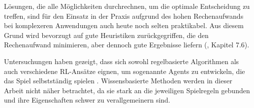 Lösungen, die alle Möglichkeiten durchrechnen, um die optimale Entscheidung zu treffen, sind für den Einsatz in der Praxis aufgrund des hohen Rechenaufwands bei komplexeren Anwendungen auch heute noch selten praktikabel. Aus diesem Grund wird bevorzugt auf gute Heuristiken zurückgegriffen, die den Rechenaufwand minimieren, aber dennoch gute Ergebnisse liefern (\cite{Heineman.October2008}, Kapitel 7.6).

Untersuchungen haben gezeigt, dass sich sowohl regelbasierte Algorithmen als auch verschiedene RL-Ansätze eignen, um sogenannte Agents zu entwickeln, die das Spiel selbstständig spielen \cite{Thill.2012} \cite{Wäldchen.2022} \cite{Taylor.2024} \cite{Sheoran.2022} \cite{Qiu.2022}. Wissensbasierte Methoden werden in dieser Arbeit nicht näher betrachtet, da sie stark an die jeweiligen Spielregeln gebunden und ihre Eigenschaften schwer zu verallgemeinern sind.
